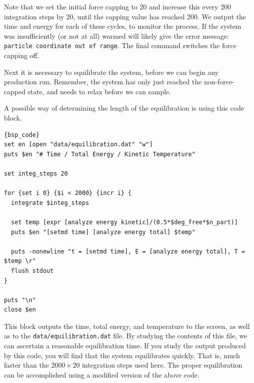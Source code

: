 \documentclass[
a4paper,                        %
11pt,                           %
twoside,                        %
footsepline,                    %
headsepline,                    %
headexclude,                    %
footexclude,                    %
pagesize,                       %
]{scrartcl}
\newtheorem{task}{Task}
\begin{document}
\noindent Note that we set the initial force capping to 20 and increase this every 200 integration steps by 20, until the capping value has reached 200. We output the time and energy for each of these cycles, to monitor the process. If the system was insufficiently (or not at all) warmed \es{} will likely give the error message: \texttt{particle coordinate out of range}. The final command switches the force capping off.

Next it is necessary to equilibrate the system, before we can begin any production run. Remember, the system has only just reached the non-force-capped state, and needs to relax before we can sample. 

\vspace{1cm}
\vspace{1cm}

\noindent A possible way of determining the length of the equilibration is using this code block.

{\small\vspace{0,2cm}
\begin{lstlisting}[firstnumber= auto]{bsp_code}
set en [open "data/equilibration.dat" "w"]
puts $en "# Time / Total Energy / Kinetic Temperature"

set integ_steps 20

for {set i 0} {$i < 2000} {incr i} {
  integrate $integ_steps

  set temp [expr [analyze energy kinetic]/(0.5*$deg_free*$n_part)]
  puts $en "[setmd time] [analyze energy total] $temp"

  puts -nonewline "t = [setmd time], E = [analyze energy total], T = $temp \r"
  flush stdout
}

puts "\n"
close $en
\end{lstlisting}\vspace{0,2cm}
}

\noindent This block outputs the time, total energy, and temperature to the screen, as well as to the \texttt{data/equilibration.dat} file. By studying the contents of this file, we can ascertain a reasonable equilibration time. If you study the output produced by this code, you will find that the system equilibrates quickly. That is, much faster than the $2000 \times 20$ integration steps used here. The proper equilibration can be accomplished using a modified version of the above code.
\end{document}
